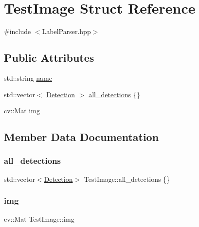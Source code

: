 \hypertarget{struct_test_image}{}\section{Test\+Image Struct Reference}
\label{struct_test_image}


{\ttfamily \#include $<$Label\+Parser.\+hpp$>$}

\subsection*{Public Attributes}
\begin{DoxyCompactItemize}
\item 
std\+::string \hyperlink{struct_test_image_a53e7396d578566495ce7a5291b5e8dc5}{name}
\item 
std\+::vector$<$ \hyperlink{struct_detection}{Detection} $>$ \hyperlink{struct_test_image_ae2a58c7febd059cc3b2cc4c74bf81ba5}{all\+\_\+detections} \{\}
\item 
cv\+::\+Mat \hyperlink{struct_test_image_a021bb1d1bd261d9237e5c4298ade0fc4}{img}
\end{DoxyCompactItemize}


\subsection{Member Data Documentation}
\mbox{\label{struct_test_image_ae2a58c7febd059cc3b2cc4c74bf81ba5}} 
\subsubsection{\texorpdfstring{all\+\_\+detections}{all\_detections}}
{\footnotesize\ttfamily std\+::vector$<$\hyperlink{struct_detection}{Detection}$>$ Test\+Image\+::all\+\_\+detections \{\}}

\mbox{\label{struct_test_image_a021bb1d1bd261d9237e5c4298ade0fc4}} 
\subsubsection{\texorpdfstring{img}{img}}
{\footnotesize\ttfamily cv\+::\+Mat Test\+Image\+::img}

